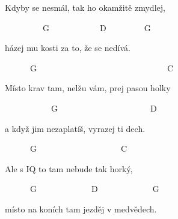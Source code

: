 Kdyby se nesmál, tak ho okamžitě zmydlej,

~~~~~~~~~G~~~~~~~~~~~~D~~~~~~~~~G

házej mu kosti za to, že se nedívá.

\bigskip

~~~~~~G~~~~~~~~~~~~~~~~~~~~~~~~~~~~~~~C

Místo krav tam, nelžu vám, prej pasou holky

~~~~~~~~~~~G~~~~~~~~~~~~~~~~~~~~~~D

a když jim nezaplatíš, vyrazej ti dech.

~~~~~~G~~~~~~~~~~~~~~~~~~~~C

Ale s IQ to tam nebude tak horký,

~~~~~~G~~~~~~~~~~~~~D~~~~~~~~~~~~~G

místo na koních tam jezděj v medvědech.

\bigskip

\chorus \chorus